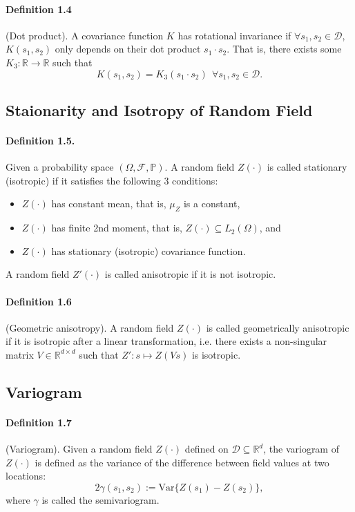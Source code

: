 \documentclass{article}
\begin{document}
\paragraph{Definition 1.4} (Dot product). A covariance function $K$ has rotational invariance if $\forall s_1,s_2\in\mathcal{D}$, $K(s_1,s_2)$ only depends on their dot product $s_1\cdot s_2$. That is, there exists some $K_3:\mathbb{R}\to\mathbb{R}$ such that
\begin{equation*}
	K(s_1,s_2) = K_3(s_1\cdot s_2)\ \ \forall s_1,s_2\in\mathcal{D}.\tag{1.6}
\end{equation*}

\subsection{Staionarity and Isotropy of Random Field}
\paragraph{Definition 1.5.} Given a probability space $(\Omega, \mathcal{F},\mathbb{P})$. A random field $Z(\cdot)$ is called stationary (isotropic) if it satisfies the following 3 conditions:
\begin{itemize}
	\item $Z(\cdot)$ has constant mean, that is, $\mu_Z$ is a constant,
	\item $Z(\cdot)$ has finite 2nd moment, that is, $Z(\cdot)\subseteq L_2(\Omega)$, and
	\item $Z(\cdot)$ has stationary (isotropic) covariance function.
\end{itemize} 

A random field $Z'(\cdot)$ is called anisotropic if it is not isotropic.

\paragraph{Definition 1.6} (Geometric anisotropy). A random field $Z(\cdot)$ is called geometrically anisotropic if it is isotropic after a linear transformation, i.e. there exists a non-singular matrix $V\in\mathbb{R}^{d\times d}$ such that $Z': s \mapsto Z(Vs)$ is isotropic.

\subsection{Variogram}
\paragraph{Definition 1.7} (Variogram). Given a random field $Z(\cdot)$ defined on $\mathcal{D}\subseteq\mathbb{R}^d$, the variogram of $Z(\cdot)$ is defined as the variance of the difference between field values at two locations:
\begin{equation*}
	2\gamma(s_1,s_2) := \mathrm{Var}\lbrace Z(s_1) - Z(s_2)\rbrace,\tag{1.7}
\end{equation*}
where $\gamma$ is called the semivariogram. 
\end{document}
